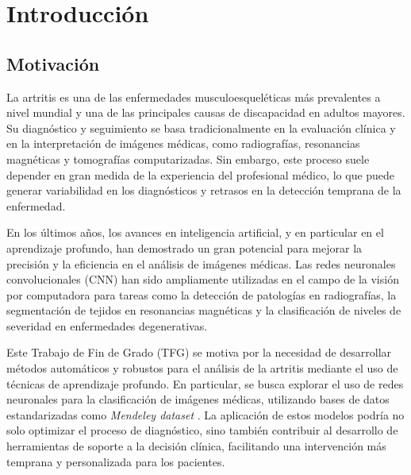 \documentclass[11pt,spanish,listoffigures,listoftables]{tfgetsinf}
\begin{document}

\chapter{Introducción}  %

\section{Motivación}     %
La artritis es una de las enfermedades musculoesqueléticas más prevalentes a nivel mundial y una de las principales causas de discapacidad en adultos mayores. Su diagnóstico y seguimiento se basa tradicionalmente en la evaluación clínica y en la interpretación de imágenes médicas, como radiografías, resonancias magnéticas y tomografías computarizadas. Sin embargo, este proceso suele depender en gran medida de la experiencia del profesional médico, lo que puede generar variabilidad en los diagnósticos y retrasos en la detección temprana de la enfermedad.

En los últimos años, los avances en inteligencia artificial, y en particular en el aprendizaje profundo, han demostrado un gran potencial para mejorar la precisión y la eficiencia en el análisis de imágenes médicas. Las redes neuronales convolucionales (CNN) han sido ampliamente utilizadas en el campo de la visión por computadora para tareas como la detección de patologías en radiografías, la segmentación de tejidos en resonancias magnéticas y la clasificación de niveles de severidad en enfermedades degenerativas.

Este Trabajo de Fin de Grado (TFG) se motiva por la necesidad de desarrollar métodos automáticos y robustos para el análisis de la artritis mediante el uso de técnicas de aprendizaje profundo. En particular, se busca explorar el uso de redes neuronales para la clasificación de imágenes médicas, utilizando bases de datos estandarizadas como \textit{Mendeley dataset} \cite{chen2018knee}. La aplicación de estos modelos podría no solo optimizar el proceso de diagnóstico, sino también contribuir al desarrollo de herramientas de soporte a la decisión clínica, facilitando una intervención más temprana y personalizada para los pacientes.
\end{document}
